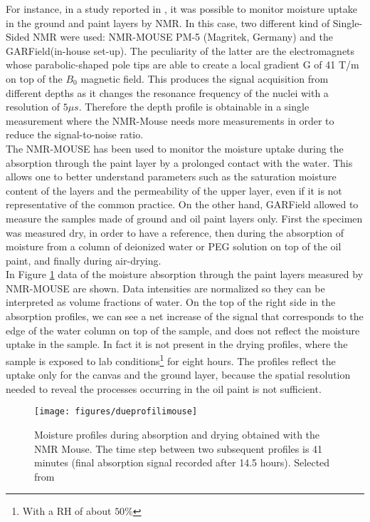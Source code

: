 \documentclass[a4paper,11pt]{report}
\begin{document}
  For instance, in a study reported in \cite{duepaint}, it was possible to monitor moisture uptake in the ground and paint layers by NMR. In this case, two different kind of Single-Sided NMR were used: NMR-MOUSE PM-5 (Magritek, Germany) and the GARField(in-house set-up). The peculiarity of the latter are the electromagnets whose parabolic-shaped pole tips are able to create a local gradient G of 41 T/m on top of the $B_0$ magnetic field\cite{duepaint}. This produces the signal acquisition from different depths as it changes the resonance frequency of the nuclei with a resolution of $5\mu s$. Therefore the depth profile is obtainable in a single measurement where the NMR-Mouse needs more measurements in order to reduce the signal-to-noise ratio\cite{duepaint}.\\
  The NMR-MOUSE has been used to monitor the moisture uptake during the absorption through the paint layer by a prolonged contact with the water. This allows one to better understand parameters such as the saturation moisture content of the layers and the permeability of the upper layer, even if it is not representative of the common practice. On the other hand, GARField allowed to measure the samples made of ground and oil paint layers only. First the specimen was measured dry, in order to have a reference, then during the absorption of moisture from a column of deionized water or PEG solution on top of the oil paint, and finally during air-drying.\\
  In Figure \ref{dueprofilimouse} data of the moisture absorption through the paint layers measured by NMR-MOUSE are shown. Data intensities are normalized so they can be interpreted as volume fractions of water. On the top of the right side in the absorption profiles, we can see a net increase of the signal that corresponds to the edge of the water column on top of the sample, and does not reflect the moisture uptake in the sample. In fact it is not present in the drying profiles, where the sample is exposed to lab conditions\footnote{With a RH of about $50\%$} for eight hours. The profiles reflect the uptake only for the canvas and the ground layer, because the spatial resolution needed to reveal the processes occurring in the oil paint is not sufficient.
  
  \begin{figure}[h]
  	\centering
  	\texttt{[image: figures/dueprofilimouse]}	
  	\caption{Moisture profiles during absorption and drying obtained with the NMR Mouse. The time step between two subsequent profiles is 41 minutes (final absorption signal recorded after 14.5 hours). Selected from \cite{duepaint}}\label{dueprofilimouse}
  \end{figure}
  
\end{document}
